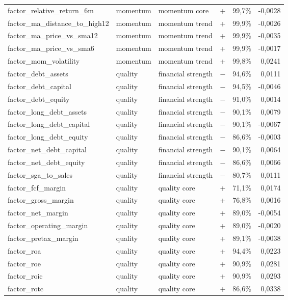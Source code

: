\begin{longtable}{@{}>{\raggedright\arraybackslash}p{4.9cm}>{\raggedright\arraybackslash}p{1.8cm}>{\raggedright\arraybackslash}p{2.8cm}crr@{}}
factor\_relative\_return\_6m & momentum & momentum core & + & 99,7\% & -0,0028 \\
factor\_ma\_distance\_to\_high12 & momentum & momentum trend & + & 99,9\% & -0,0026 \\
factor\_ma\_price\_vs\_sma12 & momentum & momentum trend & + & 99,9\% & -0,0035 \\
factor\_ma\_price\_vs\_sma6 & momentum & momentum trend & + & 99,9\% & -0,0017 \\
factor\_mom\_volatility & momentum & momentum trend & + & 99,8\% & 0,0241 \\
factor\_debt\_assets & quality & financial strength & − & 94,6\% & 0,0111 \\
factor\_debt\_capital & quality & financial strength & − & 94,5\% & -0,0046 \\
factor\_debt\_equity & quality & financial strength & − & 91,0\% & 0,0014 \\
factor\_long\_debt\_assets & quality & financial strength & − & 90,1\% & 0,0079 \\
factor\_long\_debt\_capital & quality & financial strength & − & 90,1\% & -0,0067 \\
factor\_long\_debt\_equity & quality & financial strength & − & 86,6\% & -0,0003 \\
factor\_net\_debt\_capital & quality & financial strength & − & 90,1\% & 0,0064 \\
factor\_net\_debt\_equity & quality & financial strength & − & 86,6\% & 0,0066 \\
factor\_sga\_to\_sales & quality & financial strength & − & 80,7\% & 0,0111 \\
factor\_fcf\_margin & quality & quality core & + & 71,1\% & 0,0174 \\
factor\_gross\_margin & quality & quality core & + & 76,8\% & 0,0016 \\
factor\_net\_margin & quality & quality core & + & 89,0\% & -0,0054 \\
factor\_operating\_margin & quality & quality core & + & 89,0\% & -0,0020 \\
factor\_pretax\_margin & quality & quality core & + & 89,1\% & -0,0038 \\
factor\_roa & quality & quality core & + & 94,4\% & 0,0223 \\
factor\_roe & quality & quality core & + & 90,9\% & 0,0281 \\
factor\_roic & quality & quality core & + & 90,9\% & 0,0293 \\
factor\_rotc & quality & quality core & + & 86,6\% & 0,0338 \\

\end{longtable}
